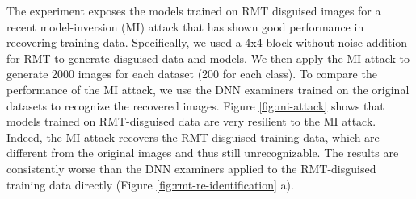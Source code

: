 \documentclass[conference]{IEEEtran}
\begin{document}
The experiment exposes the models trained on RMT disguised images for a recent model-inversion (MI) attack \cite{zhang20} that has shown good performance in recovering training data. Specifically, we used a 4x4 block without noise addition for RMT to generate disguised data and models. We then apply the MI attack to generate 2000 images for each dataset (200 for each class). To compare the performance of the MI attack, we use the DNN examiners trained on the original datasets to recognize the recovered images. Figure \ref{fig:mi-attack} shows that models trained on RMT-disguised data are very resilient to the MI attack. Indeed, the MI attack recovers the RMT-disguised training data, which are different from the original images and thus still unrecognizable. The results are consistently worse than the DNN examiners applied to the RMT-disguised training data directly (Figure \ref{fig:rmt-re-identification} a).
\end{document}
